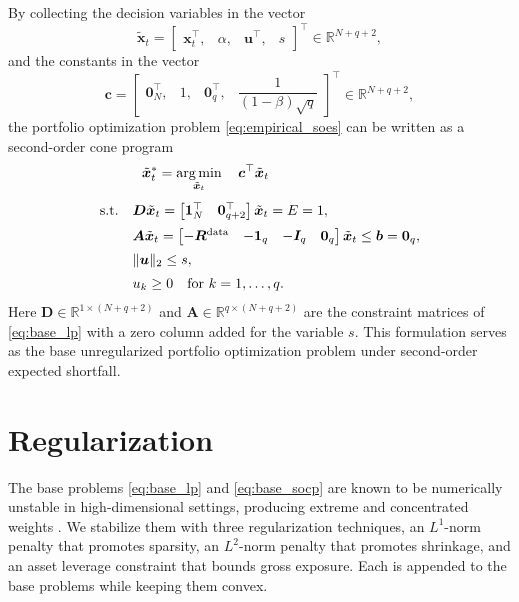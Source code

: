 By collecting the decision variables in the vector
\begin{equation*}
    \tilde{\bm{x}}_t = \begin{bmatrix} \bm{x}_t^\top, & \alpha, & \bm{u}^\top, & s \end{bmatrix}^\top \in \mathbb{R}^{N+q+2},
\end{equation*}
and the constants in the vector
\begin{equation*}
    \bm{c} = \begin{bmatrix} \bm{0}_N^\top, &  1, & \bm{0}_q^\top, & \dfrac{1}{(1-\beta)\sqrt{q}} \end{bmatrix}^\top \in \mathbb{R}^{N+q+2},
\end{equation*}
the portfolio optimization problem \eqref{eq:empirical_soes} can be written as a second-order cone program
\begin{equation} \label{eq:base_socp}
\begin{aligned}
    & \ \ \tilde{\bm{x}}_t^* = \operatorname*{arg\,min}_{\tilde{\bm{x}}_t} \quad
     \bm{c}^\top \tilde{\bm{x}}_t \\[4pt]
    \text{s.t.} \quad
    & \bm{D} \tilde{\bm{x}}_t =
    \begin{bmatrix} \bm{1}_N^\top & \bm{0}_{q+2}^\top \end{bmatrix}
    \tilde{\bm{x}}_t = E = 1, \\[2pt]
    & \bm{A} \tilde{\bm{x}}_t =
    \begin{bmatrix} -\bm{R}^{\text{data}} & -\bm{1}_q & -\bm{I}_q & \bm{0}_q \end{bmatrix}
    \tilde{\bm{x}}_t \le \bm{b} = \bm{0}_q, \\[2pt]
    & \|\bm{u}\|_2 \le s, \\[2pt]
    & u_k \ge 0 \quad \text{for } k = 1, \dots, q.
\end{aligned}
\end{equation}
Here $\bm{D} \in \mathbb{R}^{1 \times (N+q+2)}$ and $\bm{A} \in \mathbb{R}^{q \times (N+q+2)}$ are the constraint
matrices of \eqref{eq:base_lp} with a zero column added for the variable $s$. This formulation serves as the base unregularized portfolio optimization problem under
second-order expected shortfall.

\section{Regularization} \label{app:regularization}

The base problems \eqref{eq:base_lp} and \eqref{eq:base_socp} are known to be numerically unstable in
high-dimensional settings, producing extreme and concentrated weights \citep{ciliberti2007feasibility, kondor2007noise}.
We stabilize them with three regularization techniques, an $L^1$-norm penalty that promotes sparsity, an $L^2$-norm
penalty that promotes shrinkage, and an asset leverage constraint that bounds gross exposure. Each is appended to the base
problems while keeping them convex. 

